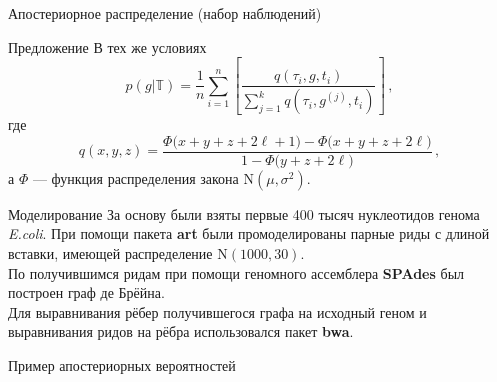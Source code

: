\documentclass[unicode, notheorems]{beamer}
\begin{document}
\begin{frame}{Апостериорное распределение (набор наблюдений)}
	\begin{block}{Предложение}
		В тех же условиях
		\begin{equation*}
			p(g | \mathbb{T}) = \frac{1}{n} \sum_{i = 1}^n \left[ \frac{q(\tau_i, g, t_i)}{\sum_{j=1}^k q(\tau_i, g^{(j)}, t_i)} \right]\,,
		\end{equation*}
		где
		\begin{equation*}
			q(x, y, z)  = \frac{\Phi\big(x+y+z+2\ell+1\big) - \Phi\big(x+y+z+2\ell\big)}{1 - \Phi\big(y + z + 2\ell\big)}\,,
		\end{equation*}
		а $\Phi$ --- функция распределения закона $\mathrm{N}(\mu, \sigma^2)$.
	\end{block}
\end{frame}

\begin{frame}{Моделирование}
	За основу были взяты первые 400 тысяч нуклеотидов генома \textit{E.coli}. При помощи пакета \textbf{art} были промоделированы парные риды с длиной вставки, имеющей распределение $\mathrm{N}(1000, 30)$.\\
	\vspace{0.3cm}
	По получившимся ридам при помощи геномного ассемблера \textbf{SPAdes} был построен граф де Брёйна.\\
	\vspace{0.3cm}
	Для выравнивания рёбер получившегося графа на исходный геном и выравнивания ридов на рёбра использовался пакет \textbf{bwa}.
\end{frame}

\begin{frame}{Пример апостериорных вероятностей}
	\begin{figure}%
		\centering
		\qquad
	\end{figure}
\end{frame}
\end{document}
